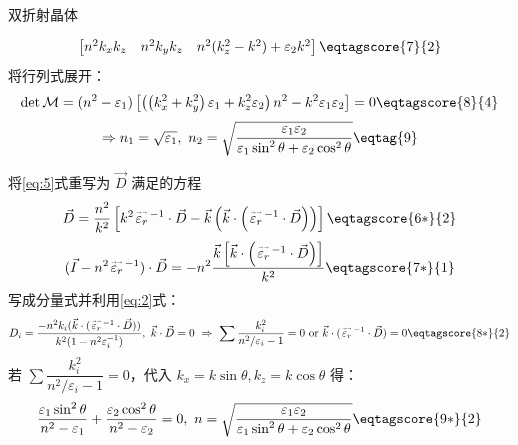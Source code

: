 \documentclass[answer]{cphos}
\begin{document}
\begin{problem}[50]{双折射晶体}
\begin{solution}
\begin{multisol}[解法]
\begin{equation}
\begin{bmatrix}
        n^2k_xk_z & n^2k_yk_z & n^2(k_z^2-k^2)+\varepsilon_2k^2
    \end{bmatrix}\eqtagscore{7}{2}
\end{equation}
将行列式展开：
\begin{equation}
    \det\mathcal M=(n^2-\varepsilon_1)\left[ \left( \left( k_x^2+k_y^2 \right)\varepsilon_1+k_z^2\varepsilon_2 \right)n^2-k^2\varepsilon_1\varepsilon_2 \right]=0\eqtagscore{8}{4}
\end{equation}
\begin{equation}
    \Rightarrow n_1=\sqrt{\varepsilon_1},\ n_2=\sqrt{\dfrac{\varepsilon_1\varepsilon_2}{\varepsilon_1\sin^2\theta+\varepsilon_2\cos^2\theta}}\eqtag{9}
\end{equation}
    \item
将\ref{eq:5}式重写为 $\vec D$ 满足的方程
\begin{equation}
    \vec D=\dfrac{n^2}{k^2}\left[ k^2{}\!\stackrel{\text{\fontsize{3}{1}$\rightarrow\rightarrow$}}{\varepsilon_r}\!{}^{-1}\cdot\vec D-\vec k\left( \vec k\cdot\left( {}\!\stackrel{\text{\fontsize{3}{1}$\rightarrow\rightarrow$}}{\varepsilon_r}\!{}^{-1}\cdot\vec D \right)\right) \right]\eqtagscore{6*}{2}
\end{equation}
\begin{equation}
    (\vec I-n^2{}\!\stackrel{\text{\fontsize{3}{1}$\rightarrow\rightarrow$}}{\varepsilon_r}\!{}^{-1})\cdot\vec D=-n^2\dfrac{\vec k\left[ \vec k\cdot\left( {}\!\stackrel{\text{\fontsize{3}{1}$\rightarrow\rightarrow$}}{\varepsilon_r}\!{}^{-1}\cdot\vec D \right) \right]}{k^2}\eqtagscore{7*}{1}
\end{equation}
写成分量式并利用\ref{eq:2}式：
\begin{equation}
    D_i=\dfrac{-n^2k_i(\vec k\cdot({}\!\stackrel{\text{\fontsize{3}{1}$\rightarrow\rightarrow$}}{\varepsilon_r}\!{}^{-1}\cdot\vec D))}{k^2(1-n^2\varepsilon_i^{-1})},\ \vec k\cdot\vec D=0\ \Rightarrow\ \sum\dfrac{k_i^2}{n^2/\varepsilon_i-1}=0\text{ or }\vec k\cdot({}\!\stackrel{\text{\fontsize{3}{1}$\rightarrow\rightarrow$}}{\varepsilon_r}\!{}^{-1}\cdot\vec D)=0\eqtagscore{8*}{2}
\end{equation}
若 $\sum\dfrac{k_i^2}{n^2/\varepsilon_i-1}=0$，代入 $k_x=k\sin\theta,k_z=k\cos\theta$ 得：
\begin{equation}
    \dfrac{\varepsilon_1\sin^2\theta}{n^2-\varepsilon_1}+\dfrac{\varepsilon_2\cos^2\theta}{n^2-\varepsilon_2}=0,\ n=\sqrt{\dfrac{\varepsilon_1\varepsilon_2}{\varepsilon_1\sin^2\theta+\varepsilon_2\cos^2\theta}}\eqtagscore{9*}{2}
\end{equation}

\end{multisol}
\end{solution}
\end{problem}
\end{document}
